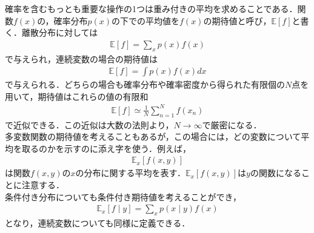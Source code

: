 \documentclass[a4j,11pt]{jsarticle}
\numberwithin{equation}{section}
\begin{document}
\subsubsection{}
確率を含むもっとも重要な操作の1つは重み付きの平均を求めることである．関数$f(x)$の，確率分布$p(x)$の下での平均値を$f(x)$の期待値と呼び，$\mathbb{E}[f]$と書く．離散分布に対しては
\begin{align}
\mathbb{E}[f] = \sum_{x}p(x)f(x)
\end{align}
で与えられ，連続変数の場合の期待値は
\begin{align}
\mathbb{E}[f] = \int p(x)f(x)dx
\end{align}
で与えられる．どちらの場合も確率分布や確率密度から得られた有限個の$N$点を用いて，期待値はこれらの値の有限和
\begin{align}
\mathbb{E}[f] \simeq \frac{1}{N}\sum_{n=1}^N f(x_n)
\end{align}
で近似できる．この近似は大数の法則より，$N\to\infty$で厳密になる．\\
多変数関数の期待値を考えることもあるが，この場合には，どの変数について平均を取るのかを示すのに添え字を使う．例えば，
\begin{align}
\mathbb{E}_x[f(x,y)]
\end{align}
は関数$f(x,y)$の$x$の分布に関する平均を表す．$\mathbb{E}_x[f(x,y)]$は$y$の関数になることに注意する．\\
条件付き分布についても条件付き期待値を考えることができ，
\begin{align}
\mathbb{E}_x[f\mid y] = \sum_{x}p(x\mid y)f(x)
\end{align}
となり，連続変数についても同様に定義できる．\\
\end{document}
